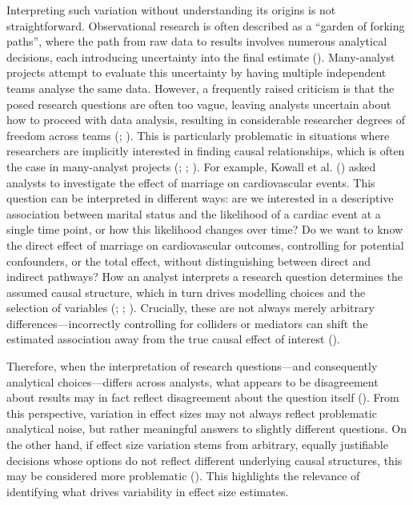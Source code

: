 \documentclass[
  man,
  floatsintext,
  longtable,
  nolmodern,
  notxfonts,
  notimes,
  colorlinks=true,linkcolor=blue,citecolor=blue,urlcolor=blue]{apa7}
\begin{document}
Interpreting such variation without understanding its origins is not
straightforward. Observational research is often described as a ``garden
of forking paths'', where the path from raw data to results involves
numerous analytical decisions, each introducing uncertainty into the
final estimate (). Many-analyst projects attempt to evaluate this uncertainty by
having multiple independent teams analyse the same data. However, a
frequently raised criticism is that the posed research questions are
often too vague, leaving analysts uncertain about how to proceed with
data analysis, resulting in considerable researcher degrees of freedom
across teams (;
). This is
particularly problematic in situations where researchers are implicitly
interested in finding causal relationships, which is often the case in
many-analyst projects (; ; ).
For example, Kowall et al. ()
asked analysts to investigate the effect of marriage on cardiovascular
events. This question can be interpreted in different ways: are we
interested in a descriptive association between marital status and the
likelihood of a cardiac event at a single time point, or how this
likelihood changes over time? Do we want to know the direct effect of
marriage on cardiovascular outcomes, controlling for potential
confounders, or the total effect, without distinguishing between direct
and indirect pathways? How an analyst interprets a research question
determines the assumed causal structure, which in turn drives modelling
choices and the selection of variables
(;
; ). Crucially,
these are not always merely arbitrary differences---incorrectly
controlling for colliders or mediators can shift the estimated
association away from the true causal effect of interest
().

Therefore, when the interpretation of research questions---and
consequently analytical choices---differs across analysts, what appears
to be disagreement about results may in fact reflect disagreement about
the question itself
().
From this perspective, variation in effect sizes may not always reflect
problematic analytical noise, but rather meaningful answers to slightly
different questions. On the other hand, if effect size variation stems
from arbitrary, equally justifiable decisions whose options do not
reflect different underlying causal structures, this may be considered
more problematic (). This highlights the relevance of identifying what
drives variability in effect size estimates.
\end{document}

